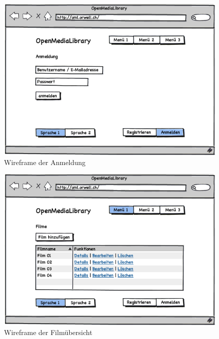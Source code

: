 \begin{figure}[p]
    \begin{center}
        \includegraphics[width=1\textwidth,angle=0]{./wireframes/03_anmeldung.png}
        \caption{Wireframe der Anmeldung}
        \label{03_anmeldung}
    \end{center}
\end{figure}

\begin{figure}[p]
    \begin{center}
        \includegraphics[width=1\textwidth,angle=0]{./wireframes/04_01_uebersicht.png}
        \caption{Wireframe der Filmübersicht}
        \label{04_01_uebersicht}
    \end{center}
\end{figure}

